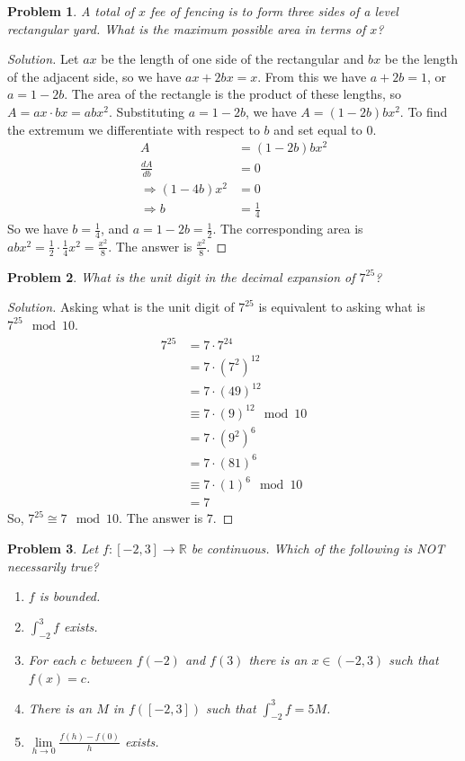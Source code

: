 \documentclass[oneside]{book}
\theoremstyle{mystyle}
\newtheorem{problem}{Problem}[section]
\begin{document}
\begin{problem}
A total of $x$ fee of fencing is to form three sides of a level rectangular yard. What is the maximum possible area in terms of $x$?
\end{problem}
\begin{proof}[Solution]
Let $ax$ be the length of one side of the rectangular and $bx$ be the length of the adjacent side, so we have $ax+2bx = x$. From this we have $a+2b = 1$, or $a = 1-2b$. The area of the rectangle is the product of these lengths, so $A = ax\cdot bx = abx^2$. Substituting $a = 1-2b$, we have $A = (1-2b)bx^2$. To find the extremum we differentiate with respect to $b$ and set equal to $0$.
\begin{align}
    A &= (1-2b)bx^2 \\
    \frac{dA}{db} &= 0 \\
    \Rightarrow (1-4b)x^2 &= 0 \\
    \Rightarrow b &= \frac{1}{4}
\end{align}
So we have $b = \frac{1}{4}$, and $a = 1-2b = \frac{1}{2}$. The corresponding area is $abx^2 = \frac{1}{2}\cdot \frac{1}{4} x^2 = \frac{x^2}{8}$. The answer is $\frac{x^2}{8}$.
\end{proof}
\begin{problem}
What is the unit digit in the decimal expansion of $7^{25}$?
\end{problem}
\begin{proof}[Solution]
    Asking what is the unit digit of $7^{25}$ is equivalent to asking what is $7^{25} \mod 10$.
\begin{align}
    \nonumber 7^{25} &= 7\cdot7^{24}\\
    \nonumber &= 7\cdot(7^2)^{12} \\
    \nonumber &= 7\cdot(49)^{12} \\
    \nonumber &\equiv 7\cdot(9)^{12} \mod 10\\
    \nonumber &= 7\cdot (9^2)^6 \\
    \nonumber &= 7 \cdot (81)^6 \\
    \nonumber &\equiv 7 \cdot (1)^6 \mod 10 \\
    \nonumber &= 7
\end{align}
So, $7^{25} \cong 7 \mod 10$. The answer is $7$.
\end{proof}
\begin{problem}
Let $f:[-2,3]\rightarrow \mathbb{R}$ be continuous. Which of the following is NOT necessarily true?
\begin{enumerate}
    \item[A.)] $f$ is bounded.
    \item[B.)] $\int_{-2}^{3}f$ exists.
    \item[C.)] For each $c$ between $f(-2)$ and $f(3)$ there is an $x\in (-2,3)$ such that $f(x) = c$.
    \item[D.)] There is an $M$ in $f([-2,3])$ such that $\int_{-2}^{3}f = 5M$.
    \item $\underset{h\rightarrow 0}\lim \frac{f(h)-f(0)}{h}$ exists.
\end{enumerate}
\end{problem}
\end{document}
